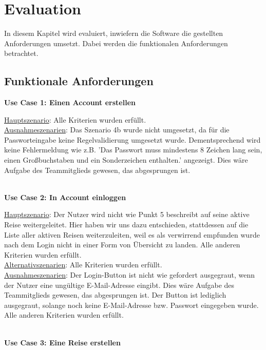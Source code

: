 \section{Evaluation}
In diesem Kapitel wird evaluiert, inwiefern die Software die gestellten Anforderungen umsetzt. Dabei werden die funktionalen Anforderungen betrachtet.

\subsection{Funktionale Anforderungen}

\textbf{Use Case 1: Einen Account erstellen}\\
\begin{addmargin}{10pt}
\underline{Hauptszenario}: Alle Kriterien wurden erfüllt.\\
\underline{Ausnahmeszenarien}: Das Szenario 4b wurde nicht umgesetzt, da für die Passworteingabe keine Regelvalidierung umgesetzt wurde. Dementsprechend wird keine Fehlermeldung wie z.B. 'Das Passwort muss mindestens 8 Zeichen lang sein, einen Großbuchstaben und ein Sonderzeichen enthalten.' angezeigt. Dies wäre Aufgabe des Teammitglieds gewesen, das abgesprungen ist.\\
\end{addmargin}
\\
\textbf{Use Case 2: In Account einloggen}\\

\begin{addmargin}{10pt}
\underline{Hauptszenario}: Der Nutzer wird nicht wie Punkt 5 beschreibt auf seine aktive Reise weitergeleitet. Hier haben wir uns dazu entschieden, stattdessen auf die Liste aller aktiven Reisen weiterzuleiten, weil es als verwirrend empfunden wurde nach dem Login nicht in einer Form von Übersicht zu landen. Alle anderen Kriterien wurden erfüllt.\\
\underline{Alternativszenarien}: Alle Kriterien wurden erfüllt.\\
\underline{Ausnahmeszenarien}: Der Login-Button ist nicht wie gefordert ausgegraut, wenn der Nutzer eine ungültige E-Mail-Adresse eingibt. Dies wäre Aufgabe des Teammitglieds gewesen, das abgesprungen ist. Der Button ist lediglich ausgegraut, solange noch keine E-Mail-Adresse bzw. Passwort eingegeben wurde. Alle anderen Kriterien wurden erfüllt.\\
\end{addmargin}
\\
\textbf{Use Case 3: Eine Reise erstellen}\\

